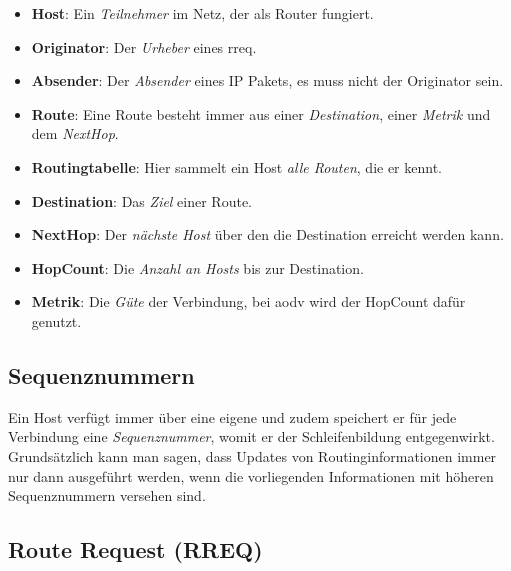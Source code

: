 \begin{itemize}
\item \textbf{Host}: Ein \textit{Teilnehmer} im Netz, der als Router fungiert.
\item \textbf{Originator}: Der \textit{Urheber} eines \gls{rreq}.
\item \textbf{Absender}: Der \textit{Absender} eines IP Pakets, es muss nicht der Originator sein.
\item \textbf{Route}: Eine Route besteht immer aus einer \textit{Destination}, einer \textit{Metrik} und dem \textit{NextHop}.
\item \textbf{Routingtabelle}: Hier sammelt ein Host \textit{alle Routen}, die er kennt. 
\item \textbf{Destination}: Das \textit{Ziel} einer Route.
\item \textbf{NextHop}: Der \textit{nächste Host} über den die Destination erreicht werden kann.
\item \textbf{HopCount}: Die \textit{Anzahl an Hosts} bis zur Destination.
\item \textbf{Metrik}: Die \textit{Güte} der Verbindung, bei \gls{aodv} wird der HopCount dafür genutzt.
\end{itemize}

\subsection{Sequenznummern}
\label{chapter:routing:aodv:seqn}

Ein Host verfügt immer über eine eigene und zudem speichert er für jede Verbindung eine \textit{Sequenznummer}, womit er der Schleifenbildung entgegenwirkt. Grundsätzlich kann man sagen, dass Updates von Routinginformationen immer nur dann ausgeführt werden, wenn die vorliegenden Informationen mit höheren Sequenznummern versehen sind.

\subsection{Route Request (RREQ)}
\label{chapter:routing:aodv:funktion:rreq}


